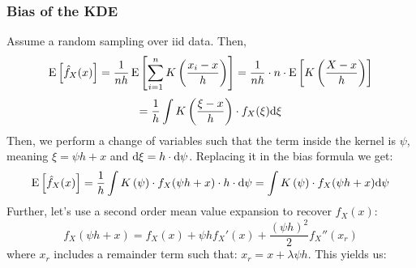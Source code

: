\subsubsection{Bias of the KDE}

Assume a random sampling over iid data. Then, $$\operatorname{E}\left[\hat f_X(x)\right] = \frac{1}{nh}\operatorname{E}\left[\sum_{i=1}^{n} K\left(\frac{x_i - x}{h}\right)\right] = \frac{1}{nh} \cdot n \cdot \operatorname{E}\left[ K\left(\frac{X - x}{h}\right)\right] $$ $$ = \frac{1}{h} \int K\left(\frac{\xi - x}{h}\right)\cdot f_X(\xi) \mathrm{d}\xi  $$ Then, we perform a change of variables such that the term inside the kernel is $\psi$, meaning $\xi = \psi h + x$ and $\mathrm{d} \xi = h\cdot \mathrm{d} \psi $. Replacing it in the bias formula we get:$$\operatorname{E}\left[\hat f_X(x)\right] = \frac{1}{h} \int K\left(\psi\right)\cdot f_X(\psi h + x) \cdot h\cdot  \mathrm{d} \psi = \int K\left(\psi\right)\cdot f_X(\psi h + x) \mathrm{d} \psi$$
Further, let's use a second order  mean value expansion to recover $f_X(x)$: $$f_X(\psi h + x) = f_X(x) + \psi h f_X'(x) + \frac{(\psi h)^2}{2}	 f_X''(x_r) $$ where $x_r$ includes a remainder term such that: $x_r = x + \lambda\psi h$. This yields us: 

